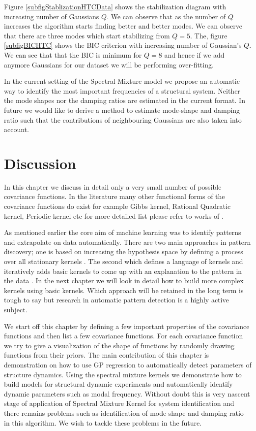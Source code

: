 Figure \ref{subfigStablizationHTCData} shows the stabilization diagram with increasing number of Gaussians $Q$. We can observe that as the number of $Q$ increases the algorithm starts finding better and better modes. We can observe that there are three modes which start stabilizing from $Q=5$. The, figure \ref{subfigBICHTC} shows the BIC criterion with increasing number of Gaussian's $Q$. We can see that that the BIC is minimum for $Q=8$ and hence if we add anymore Gaussians for our dataset we will be performing over-fitting. 

In the current setting of the Spectral Mixture model we propose an automatic way to identify the most important frequencies of a structural system. Neither the mode shapes nor the damping ratios are estimated in the current format. In future we would like to derive a method to estimate mode-shape and damping ratio such that the contributions of neighbouring Gaussians are also taken into account. 

\section{Discussion}
In this chapter we discuss in detail only a very small number of possible covariance functions. In the literature many other functional forms of the covariance functions do exist for example Gibbs kernel, Rational Quadratic kernel, Periodic kernel etc for more detailed list please refer to works of \cite{Rasmussen2005, duvenaud2013structure, wilson2014thesis}. 

As mentioned earlier the core aim of machine learning was to identify patterns and extrapolate on data automatically. There are two main approaches in pattern discovery; one is based on increasing the hypothesis space by defining a process over all stationary kernels \cite{wilson2012process}. The second which defines a language of kernels and iteratively adds basic kernels to come up with an explanation to the pattern in the data \cite{lloyd2014automatic}. In the next chapter we will look in detail how to build more complex kernels using basic kernels. Which approach will be retained in the long term is tough to say but research in automatic pattern detection is a highly active subject. 

We start off this chapter by defining a few important properties of the covariance functions and then list a few covariance functions. For each covariance function we try to give a visualization of the shape of functions by randomly drawing functions from their priors. The main contribution of this chapter is demonstration on how to use GP regression to automatically detect parameters of structure dynamics. Using the spectral mixture kernels we demonstrate how to build models for structural dynamic experiments and automatically identify dynamic parameters such as modal frequency. Without doubt this is very nascent stage of application of Spectral Mixture Kernel for system identification and there remains problems such as identification of mode-shape and damping ratio in this algorithm. We wish to tackle these problems in the future. 


